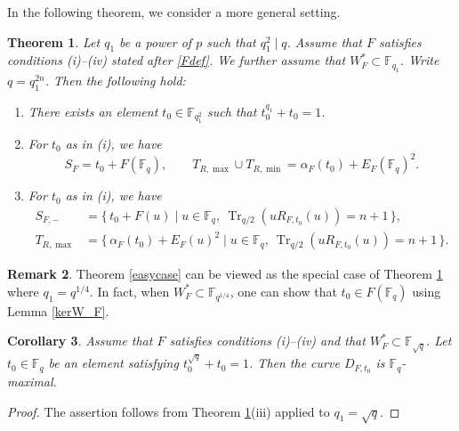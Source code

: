 \documentclass[12pt,a4paper]{amsart}
\newtheorem{theorem}{Theorem}[section]
\newtheorem{corollary}[theorem]{Corollary}
\theoremstyle{definition}
\newtheorem{remark}[theorem]{Remark}
\def\F{{\mathbb F}}
\theoremstyle{remark}
\DeclareMathOperator{\Tr}{Tr}
\begin{document}
In the following theorem, we consider a more general setting. 
\begin{theorem}\label{exmax}
Let $q_1$ be a power of $p$ such that $q_1^2\mid q$. Assume that $F$ satisfies conditions \textup{(i)--(iv)} stated after \eqref{Fdef}. We further assume that $W_F^\ast\subset \F_{q_1}$. Write  $q=q_1^{2n}$. Then the following hold: 
\begin{enumerate}
\item There exists an element $t_0\in\F_{q_1^2}$ such that $t_0^{q_1}+t_0=1$. 
\item For $t_0$ as in \textup{(i)}, we have 
\[
S_F=t_0+F(\F_q), \qquad 
T_{R,\max} \cup T_{R,\min}=\alpha_F(t_0)+E_F(\F_q)^2.\]

\item For $t_0$ as in \textup{(i)}, we have 
\begin{align*}
S_{F,-} &= \{\,t_0+F(u)\mid u\in \F_q,\ \Tr_{q/2}(uR_{F,t_0}(u))=n+1\,\},\\
T_{R,\max} &= \{\,\alpha_F(t_0)+E_F(u)^2\mid u\in\F_q,\ \Tr_{q/2}(uR_{F,t_0}(u))=n+1\,\}.
\end{align*}

\end{enumerate}
\end{theorem}

\begin{remark}
    Theorem \ref{easycase} can be viewed as the special case of Theorem \ref{exmax} where $q_1=q^{1/4}$. In fact, when $W_F^\ast\subset \F_{q^{1/4}}$, one can show that $t_0\in F(\F_q)$  using Lemma \ref{kerW_F}.  
\end{remark}

\begin{corollary}\label{exmaxc}
    Assume that $F$ satisfies conditions \textup{(i)--(iv)} and that $W_F^\ast\subset \F_{\sqrt{q}}$. 
    Let $t_0\in \F_q$ be an element satisfying $t_0^{\sqrt{q}}+t_0=1$. 
    Then the curve $D_{F,t_0}$ is $\F_q$-maximal. 
\end{corollary}
\begin{proof}
The assertion follows from Theorem \ref{exmax}(iii) applied to $q_1=\sqrt{q}$. 
\end{proof}
\end{document}
